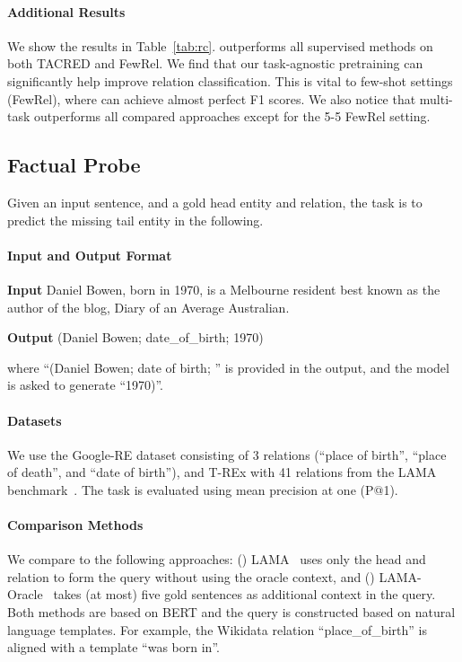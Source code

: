 \paragraph{Additional Results}
We show the results in Table~\ref{tab:rc}. \method outperforms all supervised methods on both TACRED and FewRel. We find that our task-agnostic pretraining can significantly help improve relation classification. This is vital to few-shot settings (FewRel), where \method can achieve almost perfect F1 scores. We also notice that multi-task \method outperforms all compared approaches except for the 5-5 FewRel setting.

\subsection{Factual Probe}
Given an input sentence, and a gold head entity and relation, the task is to predict the missing tail entity in the following.
\paragraph{Input and Output Format}
\begin{enumerate*}
    \item[] {\bf Input} Daniel Bowen, born in 1970, is a Melbourne resident best known as the author of the blog, Diary of an Average Australian.
    \item[] {\bf Output} (Daniel Bowen; date\_of\_birth; 1970)
\end{enumerate*}

\noindent where ``(Daniel Bowen; date of birth; '' is provided in the output, and the model is asked to generate ``1970)''.

\paragraph{Datasets} We use the Google-RE dataset consisting of 3 relations (``place of birth'', ``place of death'', and ``date of birth''), and T-REx with 41 relations from the LAMA benchmark~\cite{petroni2019language}. The task is evaluated using mean precision at one (P@1).

\paragraph{Comparison Methods} We compare to the following approaches: (\expandafter{}) LAMA~\cite{petroni2019language} uses only the head and relation to form the query without using the oracle context, and (\expandafter{}) LAMA-Oracle~\cite{petroni2020context} takes (at most) five gold sentences as additional context in the query. Both methods are based on BERT and the query is constructed based on natural language templates. For example, the Wikidata relation ``place\_of\_birth'' is aligned with a template ``was born in''.

